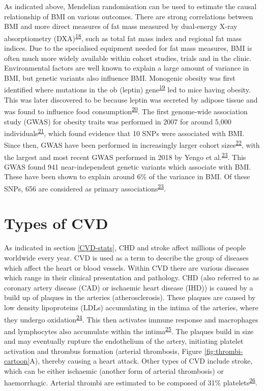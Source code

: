 \documentclass[11pt,twoside]{bristolthesis}
\begin{document}
As indicated above, Mendelian randomisation can be used to estimate the causal relationship of BMI on various outcomes. There are strong correlations between BMI and more direct measures of fat mass measured by dual-energy X-ray absorptiometry (DXA)\textsuperscript{\protect\hyperlink{ref-Bell2018}{18}}, such as total fat mass index and regional fat mass indices. Due to the specialised equipment needed for fat mass measures, BMI is often much more widely available within cohort studies, trials and in the clinic. Environmental factors are well known to explain a large amount of variance in BMI, but genetic variants also influence BMI. Monogenic obesity was first identified where mutations in the ob (leptin) gene\textsuperscript{\protect\hyperlink{ref-Zhang1994}{19}} led to mice having obesity. This was later discovered to be because leptin was secreted by adipose tissue and was found to influence food consumption\textsuperscript{\protect\hyperlink{ref-Friedman1998}{20}}. The first genome-wide association study (GWAS) for obesity traits was performed in 2007 for around 5,000 individuals\textsuperscript{\protect\hyperlink{ref-Scuteri2007}{21}}, which found evidence that 10 SNPs were associated with BMI. Since then, GWAS have been performed in increasingly larger cohort sizes\textsuperscript{\protect\hyperlink{ref-Locke2015}{22}}, with the largest and most recent GWAS performed in 2018 by Yengo et al.\textsuperscript{\protect\hyperlink{ref-Yengo2018}{23}}. This GWAS found 941 near-independent genetic variants which associate with BMI. These have been shown to explain around 6\% of the variance in BMI. Of these SNPs, 656 are considered as primary associations\textsuperscript{\protect\hyperlink{ref-Yengo2018}{23}}.

\hypertarget{types-of-cvd}{%
\section{Types of CVD}\label{types-of-cvd}}

As indicated in section \ref{CVD-stats}, CHD and stroke affect millions of people worldwide every year. CVD is used as a term to describe the group of diseases which affect the heart or blood vessels. Within CVD there are various diseases which range in their clinical presentation and pathology. CHD (also referred to as coronary artery disease (CAD) or ischaemic heart disease (IHD)) is caused by a build up of plaques in the arteries (atherosclerosis). These plaques are caused by low density lipoproteins (LDLs) accumulating in the intima of the arteries, where they undergo oxidation\textsuperscript{\protect\hyperlink{ref-Bentzon2014}{24}}. This then activates immune response and macrophages and lymphocytes also accumulate within the intima\textsuperscript{\protect\hyperlink{ref-Badimon2012}{25}}. The plaques build in size and may eventually rupture the endothelium of the artery, initiating platelet activation and thrombus formation (arterial thrombosis, Figure \ref{fig:thrombi-cartoon}A), thereby causing a heart attack. Other types of CVD include stroke, which can be either ischaemic (another form of arterial thrombosis) or haemorrhagic. Arterial thrombi are estimated to be composed of 31\% platelets\textsuperscript{\protect\hyperlink{ref-Chernysh2020}{26}}.
\end{document}
